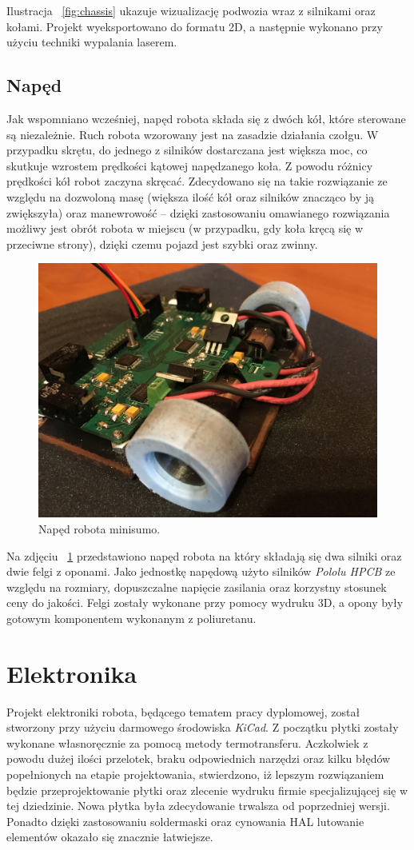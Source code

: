 Ilustracja ~\ref{fig:chassis} ukazuje wizualizację podwozia wraz z silnikami oraz kołami. Projekt wyeksportowano do formatu 2D, a następnie wykonano przy użyciu techniki wypalania laserem. 

\subsection{Napęd}
Jak wspomniano wcześniej, napęd robota składa się z dwóch kół, które sterowane są niezależnie. Ruch robota wzorowany jest na zasadzie działania czołgu. W przypadku skrętu, do jednego z silników dostarczana jest większa moc, co skutkuje wzrostem prędkości kątowej napędzanego koła. Z powodu różnicy prędkości kół robot zaczyna skręcać. Zdecydowano się na takie rozwiązanie ze względu na dozwoloną masę (większa ilość kół oraz silników znacząco by ją zwiększyła) oraz manewrowość – dzięki zastosowaniu omawianego rozwiązania możliwy jest obrót robota w miejscu (w przypadku, gdy koła kręcą się w przeciwne strony), dzięki czemu pojazd jest szybki oraz zwinny. 

\begin{figure}[H]
	\centering
		\includegraphics[width=0.75\linewidth]{pic04/drive.JPG}
	\caption{Napęd robota minisumo.}
	\label{fig:drive}	
\end{figure}

Na zdjęciu ~\ref{fig:drive} przedstawiono napęd robota na który składają się dwa silniki oraz dwie felgi z oponami. Jako jednostkę napędową użyto silników \textit{Pololu HPCB} ze względu  na rozmiary, dopuszczalne napięcie zasilania oraz korzystny stosunek ceny do jakości. Felgi zostały wykonane przy pomocy wydruku 3D, a opony były gotowym komponentem wykonanym z poliuretanu.

\section{Elektronika}
Projekt elektroniki robota, będącego tematem pracy dyplomowej, został stworzony przy użyciu darmowego środowiska \textit{KiCad}. Z początku płytki zostały wykonane własnoręcznie za pomocą metody termotransferu. Aczkolwiek z powodu dużej ilości przelotek, braku odpowiednich narzędzi oraz kilku błędów popełnionych na etapie projektowania, stwierdzono, iż lepszym rozwiązaniem będzie przeprojektowanie płytki oraz zlecenie wydruku firmie specjalizującej się w tej dziedzinie. Nowa płytka była zdecydowanie trwalsza od poprzedniej wersji. Ponadto dzięki zastosowaniu soldermaski oraz cynowania HAL lutowanie elementów okazało się znacznie łatwiejsze.  

